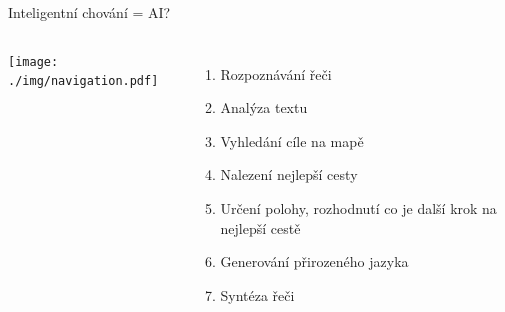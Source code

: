\documentclass[aspectratio=169,dvipsnames]{beamer}
\begin{document}
\begin{frame}{Inteligentní chování = AI?}

    \begin{columns}
        \texttt{[image: ./img/navigation.pdf]}


        \begin{enumerate}

            \item<2-> Rozpoznávání řeči \\

            \item<3-> Analýza textu \\

            \item<4-> Vyhledání cíle na mapě \\

            \item<5-> Nalezení nejlepší cesty \\

            \item<6-> Určení polohy, rozhodnutí co je další krok na nejlepší cestě

            \item<7-> Generování přirozeného jazyka \\

            \item<8-> Syntéza řeči \\

        \end{enumerate}

    \end{columns}

\end{frame}

\end{document}
